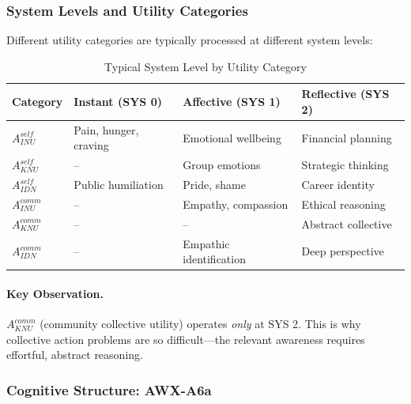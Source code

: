 \subsubsection{System Levels and Utility Categories}

Different utility categories are typically processed at different system levels:

\begin{table}[htbp]
\centering
\caption{Typical System Level by Utility Category}
\label{tab:system-utility-mapping}
\renewcommand{\arraystretch}{1.3}
\begin{tabular}{@{}llll@{}}
\toprule
\textbf{Category} & \textbf{Instant (SYS 0)} & \textbf{Affective (SYS 1)} & \textbf{Reflective (SYS 2)} \\
\midrule
$A^{self}_{INU}$ & Pain, hunger, craving & Emotional wellbeing & Financial planning \\
$A^{self}_{KNU}$ & -- & Group emotions & Strategic thinking \\
$A^{self}_{IDN}$ & Public humiliation & Pride, shame & Career identity \\
$A^{comm}_{INU}$ & -- & Empathy, compassion & Ethical reasoning \\
$A^{comm}_{KNU}$ & -- & -- & Abstract collective \\
$A^{comm}_{IDN}$ & -- & Empathic identification & Deep perspective \\
\bottomrule
\end{tabular}
\end{table}

\paragraph{Key Observation.}
$A^{comm}_{KNU}$ (community collective utility) operates \emph{only} at SYS 2.
This is why collective action problems are so difficult---the relevant 
awareness requires effortful, abstract reasoning.


\subsubsection{Cognitive Structure: AWX-A6a}


